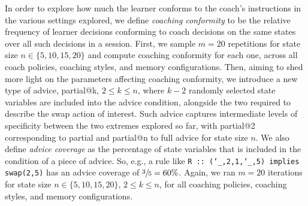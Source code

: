 \documentclass[a4paper,twoside]{article}
\makeatletter
\newcommand{\ttus}{\char`_}
\newcommand{\partialadvice}[1]{partial@{#1}}
\makeatother
\begin{document}
In order to explore how much the learner conforms to the coach's instructions in the various settings explored, we define \emph{coaching conformity} to be the relative frequency of learner decisions conforming to coach decisions on the same states over all such decisions in a session. First, we sample $m=20$ repetitions for state size $n\in\{5,10,15,20\}$ and compute coaching conformity for each one, across all coach policies, coaching styles, and memory configurations. Then, aiming to shed more light on the parameters affecting coaching conformity, we introduce a new type of advice, \partialadvice{k}, $2\leq k\leq n$, where $k-2$ randomly selected state variables are included into the advice condition, alongside the two required to describe the swap action of interest. Such advice captures intermediate levels of specificity between the two extremes explored so far, with \partialadvice{2} corresponding to partial and \partialadvice{n} to full advice for state size $n$. We also define \emph{advice coverage} as the percentage of state variables that is included in the condition of a piece of advice. So, e.g., a rule like \texttt{R ::~(\ttus,2,1,\ttus,5) implies swap(2,5)} has an advice coverage of $\sfrac{3}{5}=60\%$. Again, we ran $m=20$ iterations for state size $n\in\{5,10,15,20\}$, $2\leq k\leq n$, for all coaching policies, coaching styles, and memory configurations.
\end{document}
